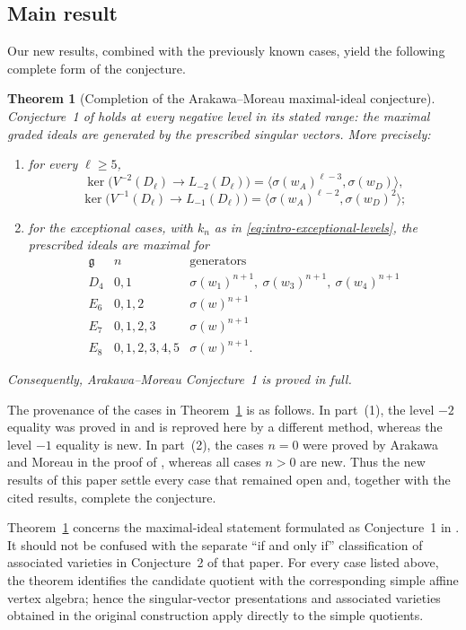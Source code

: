 \documentclass[11pt,reqno]{amsart}
\newtheorem{theorem}{Theorem}[section]
\theoremstyle{definition}
\theoremstyle{remark}
\begin{document}
\subsection{Main result}

Our new results, combined with the previously known cases, yield the
following complete form of the conjecture.

\begin{theorem}[Completion of the Arakawa--Moreau maximal-ideal conjecture]
\label{thm:main}
Conjecture~1 of \cite{ArakawaMoreau2018} holds at every negative level in
its stated range: the maximal graded ideals are generated by the prescribed
singular vectors.  More precisely:
\begin{enumerate}
\item for every $\ell\ge5$,
\[
\ker\bigl(V^{-2}(D_\ell)\to L_{-2}(D_\ell)\bigr)
 =\bigl\langle\sigma(w_A)^{\ell-3},\sigma(w_D)\bigr\rangle,
\]
\[
\ker\bigl(V^{-1}(D_\ell)\to L_{-1}(D_\ell)\bigr)
 =\bigl\langle\sigma(w_A)^{\ell-2},\sigma(w_D)^2\bigr\rangle;
\]
\item for the exceptional cases, with $k_n$ as in
\eqref{eq:intro-exceptional-levels}, the prescribed ideals are maximal
for
\[
\begin{array}{c|c|c}
\mathfrak g & n & \text{generators}\\ \hline
D_4 & 0,1 & \sigma(w_1)^{n+1},\ \sigma(w_3)^{n+1},\
                 \sigma(w_4)^{n+1}\\
E_6 & 0,1,2 & \sigma(w)^{n+1}\\
E_7 & 0,1,2,3 & \sigma(w)^{n+1}\\
E_8 & 0,1,2,3,4,5 & \sigma(w)^{n+1}.
\end{array}
\]
\end{enumerate}
Consequently, Arakawa--Moreau Conjecture~1 is proved in full.
\end{theorem}

The provenance of the cases in Theorem~\ref{thm:main} is as follows.
In part~(1), the level $-2$ equality was proved in
\cite[Section~6, Corollary~6.6(1)]
{AdamovicKacMosenederFrajriaPapiPerse2020}
and is reproved here by a different method, whereas the level $-1$
equality is new.  In part~(2), the cases $n=0$ were proved by Arakawa and
Moreau in the proof of \cite[Theorem~3.1]{ArakawaMoreau2018}, whereas all
cases $n>0$ are new.  Thus the new results of this paper settle every case
that remained open and, together with the cited results, complete the
conjecture.

Theorem~\ref{thm:main} concerns the maximal-ideal statement formulated as
Conjecture~1 in \cite{ArakawaMoreau2018}.  It should not be confused with
the separate ``if and only if'' classification of associated varieties in
Conjecture~2 of that paper.  For every case listed above, the theorem
identifies the candidate quotient with the corresponding simple affine
vertex algebra; hence the singular-vector presentations and associated
varieties obtained in the original construction apply directly to the
simple quotients.
\end{document}
